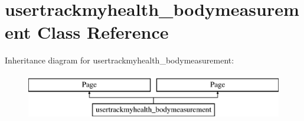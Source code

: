 \hypertarget{classusertrackmyhealth__bodymeasurement}{\section{usertrackmyhealth\-\_\-bodymeasurement Class Reference}
\label{classusertrackmyhealth__bodymeasurement}
}
Inheritance diagram for usertrackmyhealth\-\_\-bodymeasurement\-:\begin{figure}[H]
\begin{center}
\leavevmode
\includegraphics[height=2.000000cm]{classusertrackmyhealth__bodymeasurement}
\end{center}
\end{figure}

